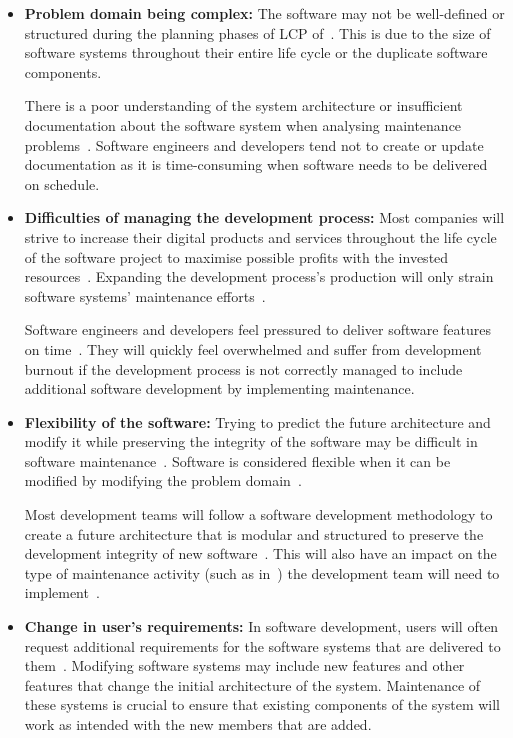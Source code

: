 \begin{itemize}
	\item \textbf{Problem domain being complex:} The software may not be well-defined or structured during the planning phases of LCP of~. This is due to the size of software systems throughout their entire life cycle or the duplicate software components. \par There is a poor understanding of the system architecture or insufficient documentation about the software system when analysing maintenance problems~\cite{Galster2019}. Software engineers and developers tend not to create or update documentation as it is time-consuming when software needs to be delivered on schedule.
	\item \textbf{Difficulties of managing the development process:} Most companies will strive to increase their digital products and services throughout the life cycle of the software project to maximise possible profits with the invested resources~\cite{Niu2018}. Expanding the development process's production will only strain software systems' maintenance efforts~\cite{Sneed2004}. \par Software engineers and developers feel pressured to deliver software features on time~\cite{Galster2019, Lenarduzzi2017}. They will quickly feel overwhelmed and suffer from development burnout if the development process is not correctly managed to include additional software development by implementing maintenance.
	\item \textbf{Flexibility of the software:} Trying to predict the future architecture and modify it while preserving the integrity of the software may be difficult in software maintenance~\cite{Garlan1999}. Software is considered flexible when it can be modified by modifying the problem domain~\cite{Ogheneovo2014}. \par Most development teams will follow a software development methodology to create a future architecture that is modular and structured to preserve the development integrity of new software~\cite{Vijayasarathy2016}. This will also have an impact on the type of maintenance activity (such as in~) the development team will need to implement~\cite{Thamburaj2017, Snipes2018}.
	\item \textbf{Change in user's requirements:} In software development, users will often request additional requirements for the software systems that are delivered to them~\cite{Ogheneovo2014}. Modifying software systems may include new features and other features that change the initial architecture of the system. Maintenance of these systems is crucial to ensure that existing components of the system will work as intended with the new members that are added.

\end{itemize}
